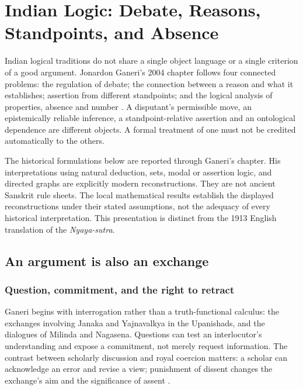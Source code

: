 \chapter{Indian Logic: Debate, Reasons, Standpoints, and Absence}
\label{sec:p13-ganeri-indian-logic}

Indian logical traditions do not share a single object language or a single
criterion of a good argument. Jonardon Ganeri's 2004 chapter follows four
connected problems: the regulation of debate; the connection between a reason
and what it establishes; assertion from different standpoints; and the logical
analysis of properties, absence and number
\cite[pp.~309--391]{Ganeri2004IndianLogicPublished}. A disputant's permissible move,
an epistemically reliable inference, a standpoint-relative assertion and an
ontological dependence are different objects. A formal treatment of one must
not be credited automatically to the others.

The historical formulations below are reported through Ganeri's chapter.
His interpretations using natural deduction, sets, modal or assertion logic,
and directed graphs are explicitly modern reconstructions. They are not
ancient Sanskrit rule sheets. The local mathematical results establish the
displayed reconstructions under their stated assumptions, not the adequacy
of every historical interpretation. This presentation is distinct from the
1913 English translation of the \emph{Nyaya-sutra}.

\section{An argument is also an exchange}
\label{sec:p13-ganeri-debate}

\subsection{Question, commitment, and the right to retract}

Ganeri begins with interrogation rather than a truth-functional calculus:
the exchanges involving Janaka and Yajnavalkya in the Upanishads, and the
dialogues of Milinda and Nagasena. Questions can test an interlocutor's
understanding and expose a commitment, not merely request information.
The contrast between scholarly discussion and royal coercion matters:
a scholar can acknowledge an error and revise a view; punishment of dissent
changes the exchange's aim and the significance of assent
\cite[pp.~309--314]{Ganeri2004IndianLogicPublished}.


